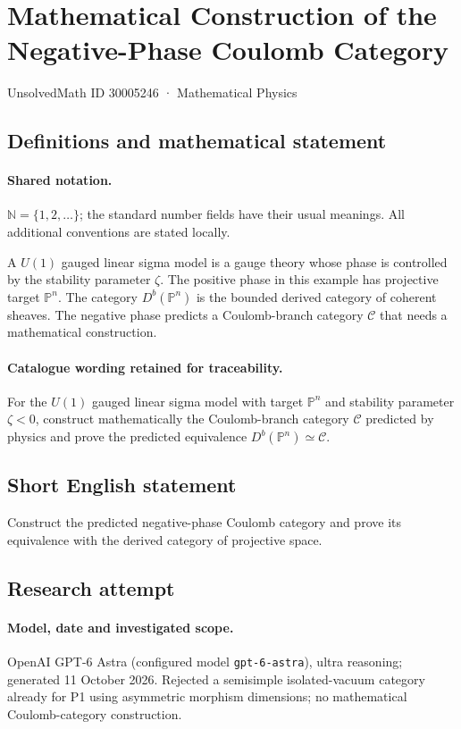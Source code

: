\documentclass[11pt]{article}
\begin{document}
\setcounter{section}{30005245}
\section{Mathematical Construction of the Negative-Phase Coulomb Category}\label{30005246}
{\small UnsolvedMath ID 30005246 · Mathematical Physics}
\subsection{Definitions and mathematical statement}

\paragraph{Shared notation.}$\mathbb N=\{1,2,\ldots\}$; the standard number fields have their usual meanings. All additional conventions are stated locally.


A $U(1)$ gauged linear sigma model is a gauge theory whose phase is controlled by the stability parameter $\zeta$. The positive phase in this example has projective target $\mathbb P^n$. The category $D^b(\mathbb P^n)$ is the bounded derived category of coherent sheaves. The negative phase predicts a Coulomb-branch category $\mathcal C$ that needs a mathematical construction.

\paragraph{Catalogue wording retained for traceability.}
For the $U(1)$ gauged linear sigma model with target $\mathbb P^n$ and stability parameter $\zeta<0$, construct mathematically the Coulomb-branch category $\mathcal C$ predicted by physics and prove the predicted equivalence $D^b(\mathbb P^n)\simeq\mathcal C$.
\subsection{Short English statement}
Construct the predicted negative-phase Coulomb category and prove its equivalence with the derived category of projective space.
\subsection{Research attempt}
\paragraph{Model, date and investigated scope.}
OpenAI GPT-6 Astra (configured model \texttt{gpt-6-astra}), ultra reasoning; generated 11 October 2026. Rejected a semisimple isolated-vacuum category already for P1 using asymmetric morphism dimensions; no mathematical Coulomb-category construction.
\end{document}
